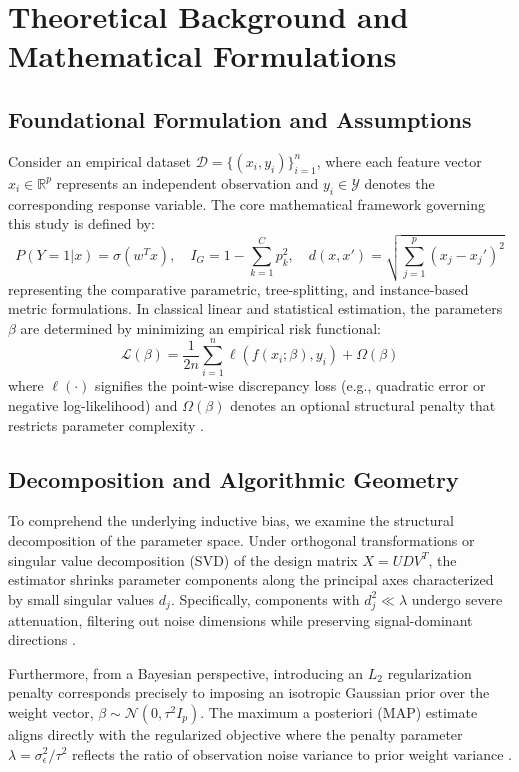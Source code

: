 \section{Theoretical Background and Mathematical Formulations}

\subsection{Foundational Formulation and Assumptions}
Consider an empirical dataset $\mathcal{D} = \{(x_i, y_i)\}_{i=1}^n$, where each feature vector $x_i \in \mathbb{R}^p$ represents an independent observation and $y_i \in \mathcal{Y}$ denotes the corresponding response variable. The core mathematical framework governing this study is defined by:
\begin{equation}
  P(Y=1|x) = \sigma(w^T x), \quad I_G = 1 - \sum_{k=1}^C p_k^2, \quad d(x, x') = \sqrt{\sum_{j=1}^p (x_j - x_j')^2}
\label{eq:core_math}
\end{equation}
representing the comparative parametric, tree-splitting, and instance-based metric formulations.
In classical linear and statistical estimation, the parameters $\beta$ are determined by minimizing an empirical risk functional:
\begin{equation}
  \mathcal{L}(\beta) = \frac{1}{2n} \sum_{i=1}^n \ell(f(x_i; \beta), y_i) + \Omega(\beta)
\end{equation}
where $\ell(\cdot)$ signifies the point-wise discrepancy loss (e.g., quadratic error or negative log-likelihood) and $\Omega(\beta)$ denotes an optional structural penalty that restricts parameter complexity \cite{bishop2006}.

\subsection{Decomposition and Algorithmic Geometry}
To comprehend the underlying inductive bias, we examine the structural decomposition of the parameter space. Under orthogonal transformations or singular value decomposition (SVD) of the design matrix $X = U D V^T$, the estimator shrinks parameter components along the principal axes characterized by small singular values $d_j$. Specifically, components with $d_j^2 \ll \lambda$ undergo severe attenuation, filtering out noise dimensions while preserving signal-dominant directions \cite{hoerl1970}.

Furthermore, from a Bayesian perspective, introducing an $L_2$ regularization penalty corresponds precisely to imposing an isotropic Gaussian prior over the weight vector, $\beta \sim \mathcal{N}(0, \tau^2 I_p)$. The maximum a posteriori (MAP) estimate aligns directly with the regularized objective where the penalty parameter $\lambda = \sigma_\epsilon^2 / \tau^2$ reflects the ratio of observation noise variance to prior weight variance \cite{murphy2012}.

